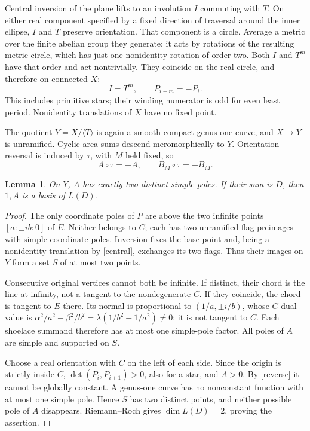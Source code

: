 \documentclass[11pt]{article}
\newtheorem{lemma}{Lemma}
\begin{document}
Central inversion of the plane lifts to an involution \(I\) commuting
with \(T\). On either real component specified by a fixed direction of
traversal around the inner ellipse, \(I\) and \(T\) preserve orientation.
That component is a circle. Average a metric over the finite abelian
group they generate: it acts by rotations of the resulting metric
circle, which has just one nonidentity rotation of order two.
Both \(I\) and \(T^m\) have that order and act nontrivially. They coincide
on the real circle, and therefore on connected \(X\):
\begin{equation}\label{central}
 I=T^m,\qquad P_{i+m}=-P_i .
\end{equation}
This includes primitive stars; their winding numerator is odd for even
least period. Nonidentity translations of \(X\) have no fixed point.

The quotient \(Y=X/\langle T\rangle\) is again a smooth compact genus-one
curve, and \(X\to Y\) is unramified. Cyclic area sums descend meromorphically
to \(Y\). Orientation reversal is induced by \(\tau\), with \(M\) held
fixed, so
\begin{equation}\label{reverse}
 A\circ\tau=-A,\qquad B_M\circ\tau=-B_M .
\end{equation}

\begin{lemma}\label{two}
On \(Y\), \(A\) has exactly two distinct simple poles.
If their sum is \(D\), then \(1,A\) is a basis of \(L(D)\).
\end{lemma}
\begin{proof}
The only coordinate poles of \(P\) are above the two infinite points
\([a:\pm ib:0]\) of \(E\). Neither belongs to \(C\); each has two
unramified flag preimages with simple coordinate poles. Inversion fixes
the base point and, being a nonidentity translation by \eqref{central},
exchanges its two flags. Thus their images on \(Y\) form a set \(S\)
of at most two points.

Consecutive original vertices cannot both be infinite. If distinct,
their chord is the line at infinity, not a tangent to the nondegenerate
\(C\). If they coincide, the chord is tangent to \(E\) there. Its normal
is proportional to \((1/a,\pm i/b)\), whose \(C\)-dual value is
\(\alpha^2/a^2-\beta^2/b^2=\lambda(1/b^2-1/a^2)\ne0\);
it is not tangent to \(C\). Each shoelace summand therefore has at most
one simple-pole factor. All poles of \(A\) are simple and supported on \(S\).

Choose a real orientation with \(C\) on the left of each side.
Since the origin is strictly inside \(C\),
\(\det(P_i,P_{i+1})>0\), also for a star, and \(A>0\).
By \eqref{reverse} it cannot be globally constant. A genus-one curve has
no nonconstant function with at most one simple pole. Hence \(S\) has
two distinct points, and neither possible pole of \(A\) disappears.
Riemann--Roch gives \(\dim L(D)=2\), proving the assertion.
\end{proof}
\end{document}
